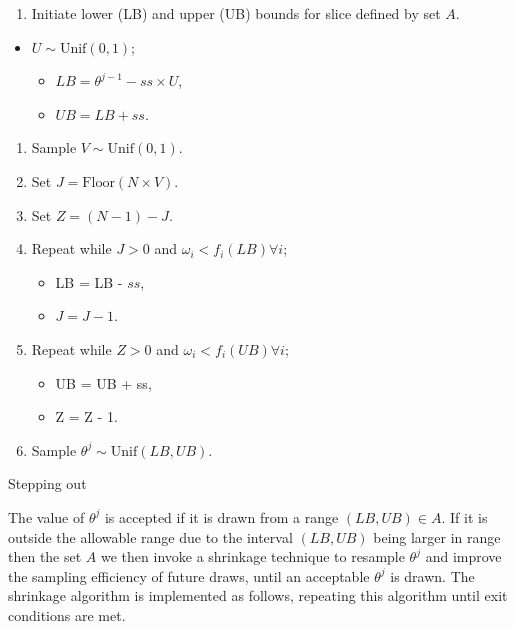 \documentclass[article]{jss}
\begin{document}
%
\begin{algorithm}[H]
\begin{enumerate}
\item Initiate lower (LB) and upper (UB) bounds for slice defined by set
$A$.\end{enumerate}
\begin{itemize}
\item $U\sim\mbox{Unif}(0,1)$; 

\begin{itemize}
\item $LB=\theta^{j-1}-ss{\times}U$, 
\item $UB=LB+ss$. 
\end{itemize}
\end{itemize}
\begin{enumerate}
\item Sample $V\sim\mbox{Unif}(0,1)$. 
\item Set $J=\mbox{Floor}(N{\times}V)$. 
\item Set $Z=(N-1)-J$. 
\item Repeat while $J>0$ and $\omega_{i}<f_{i}(LB)\forall i$;

\begin{itemize}
\item LB = LB - $ss$, 
\item $J=J-1$. 
\end{itemize}
\item Repeat while $Z>0$ and $\omega_{i}<f_{i}(UB)\forall i$;

\begin{itemize}
\item UB = UB + ss, 
\item Z = Z - 1. 
\end{itemize}
\item Sample $\theta^{j}\sim\mbox{Unif}(LB,UB)$. 
\end{enumerate}
\caption{Stepping out}
\label{alg:steppingout}
\end{algorithm}


The value of $\theta^{j}$ is accepted if it is drawn from a range
$(LB,UB)\in A$. If it is outside the allowable range due to the
interval $(LB,UB)$ being larger in range then the set $A$ we then
invoke a shrinkage technique to resample $\theta^{j}$ and improve the
sampling efficiency of future draws, until an acceptable $\theta^{j}$
is drawn.  The shrinkage algorithm is implemented as follows,
repeating this algorithm until exit conditions are met.
\end{document}

